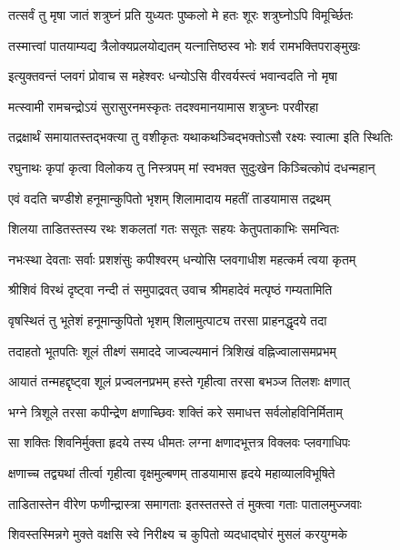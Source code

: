 \twolineshloka
{तत्सर्वं तु मृषा जातं शत्रुघ्नं प्रति युध्यतः}
{पुष्कलो मे हतः शूरः शत्रुघ्नोऽपि विमूर्च्छितः}%

\twolineshloka
{तस्मात्त्वां पातयाम्यद्य त्रैलोक्यप्रलयोद्यतम्}
{यत्नात्तिष्ठस्व भोः शर्व रामभक्तिपराङ्मुखः}%


\twolineshloka
{इत्युक्तवन्तं प्लवगं प्रोवाच स महेश्वरः}
{धन्योऽसि वीरवर्यस्त्वं भवान्वदति नो मृषा}%

\twolineshloka
{मत्स्वामी रामचन्द्रोऽयं सुरासुरनमस्कृतः}
{तदश्वमानयामास शत्रुघ्नः परवीरहा}%

\twolineshloka
{तद्रक्षार्थं समायातस्तद्भक्त्या तु वशीकृतः}
{यथाकथञ्चिद्भक्तोऽसौ रक्ष्यः स्वात्मा इति स्थितिः}%

\twolineshloka
{रघुनाथः कृपां कृत्वा विलोकय तु निस्त्रपम्}
{मां स्वभक्त सुदुःखेन किञ्चित्कोपं दधन्महान्}%


\twolineshloka
{एवं वदति चण्डीशे हनूमान्कुपितो भृशम्}
{शिलामादाय महतीं ताडयामास तद्रथम्}%

\twolineshloka
{शिलया ताडितस्तस्य रथः शकलतां गतः}
{ससूतः सहयः केतुपताकाभिः समन्वितः}%

\twolineshloka
{नभःस्था देवताः सर्वाः प्रशशंसुः कपीश्वरम्}
{धन्योसि प्लवगाधीश महत्कर्म त्वया कृतम्}%

\twolineshloka
{श्रीशिवं विरथं दृष्ट्वा नन्दी तं समुपाद्रवत्}
{उवाच श्रीमहादेवं मत्पृष्ठं गम्यतामिति}%

\twolineshloka
{वृषस्थितं तु भूतेशं हनूमान्कुपितो भृशम्}
{शिलामुत्पाट्य तरसा प्राहनद्धृदये तदा}%

\twolineshloka
{तदाहतो भूतपतिः शूलं तीक्ष्णं समाददे}
{जाज्वल्यमानं त्रिशिखं वह्निज्वालासमप्रभम्}%

\twolineshloka
{आयातं तन्महद्दृष्ट्वा शूलं प्रज्वलनप्रभम्}
{हस्ते गृहीत्वा तरसा बभञ्ज तिलशः क्षणात्}%

\twolineshloka
{भग्ने त्रिशूले तरसा कपीन्द्रेण क्षणाच्छिवः}
{शक्तिं करे समाधत्त सर्वलोहविनिर्मिताम्}%

\twolineshloka
{सा शक्तिः शिवनिर्मुक्ता हृदये तस्य धीमतः}
{लग्ना क्षणादभूत्तत्र विक्लवः प्लवगाधिपः}%

\twolineshloka
{क्षणाच्च तद्व्यथां तीर्त्वा गृहीत्वा वृक्षमुल्बणम्}
{ताडयामास हृदये महाव्यालविभूषिते}%

\twolineshloka
{ताडितास्तेन वीरेण फणीन्द्रास्त्रा समागताः}
{इतस्ततस्ते तं मुक्त्वा गताः पातालमुज्जवाः}%

\twolineshloka
{शिवस्तस्मिन्नगे मुक्ते वक्षसि स्वे निरीक्ष्य च}
{कुपितो व्यदधाद्घोरं मुसलं करयुग्मके}%

